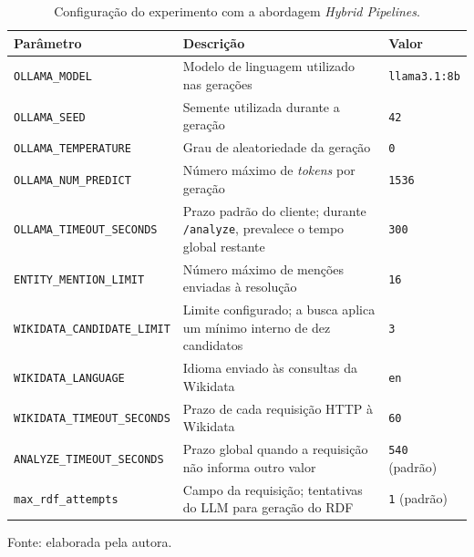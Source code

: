 \begin{table}[htbp]
    \centering
    \caption{Configuração do experimento com a abordagem \textit{Hybrid Pipelines}.}
    \label{tab:hybrid-configuracao}
    \small
    \renewcommand{\arraystretch}{1.25}
    \begin{tabular}{p{4.1cm} p{6.7cm} p{2.5cm}}
        \toprule
        \textbf{Parâmetro} & \textbf{Descrição} & \textbf{Valor} \\
        \midrule
        \texttt{OLLAMA\_MODEL}
            & Modelo de linguagem utilizado nas gerações
            & \texttt{llama3.1:8b} \\
        \texttt{OLLAMA\_SEED}
            & Semente utilizada durante a geração
            & \texttt{42} \\
        \texttt{OLLAMA\_TEMPERATURE}
            & Grau de aleatoriedade da geração
            & \texttt{0} \\
        \texttt{OLLAMA\_NUM\_PREDICT}
            & Número máximo de \textit{tokens} por geração
            & \texttt{1536} \\
        \texttt{OLLAMA\_TIMEOUT\_SECONDS}
            & Prazo padrão do cliente; durante \texttt{/analyze}, prevalece o tempo global restante
            & \texttt{300} \\
        \texttt{ENTITY\_MENTION\_LIMIT}
            & Número máximo de menções enviadas à resolução
            & \texttt{16} \\
        \texttt{WIKIDATA\_CANDIDATE\_LIMIT}
            & Limite configurado; a busca aplica um mínimo interno de dez candidatos
            & \texttt{3} \\
        \texttt{WIKIDATA\_LANGUAGE}
            & Idioma enviado às consultas da Wikidata
            & \texttt{en} \\
        \texttt{WIKIDATA\_TIMEOUT\_SECONDS}
            & Prazo de cada requisição HTTP à Wikidata
            & \texttt{60} \\
        \texttt{ANALYZE\_TIMEOUT\_SECONDS}
            & Prazo global quando a requisição não informa outro valor
            & \texttt{540} (padrão) \\
        \texttt{max\_rdf\_attempts}
            & Campo da requisição; tentativas do LLM para geração do RDF
            & \texttt{1} (padrão) \\
        \bottomrule
    \end{tabular}
    \par\smallskip
    {\footnotesize Fonte: elaborada pela autora.}
\end{table}

